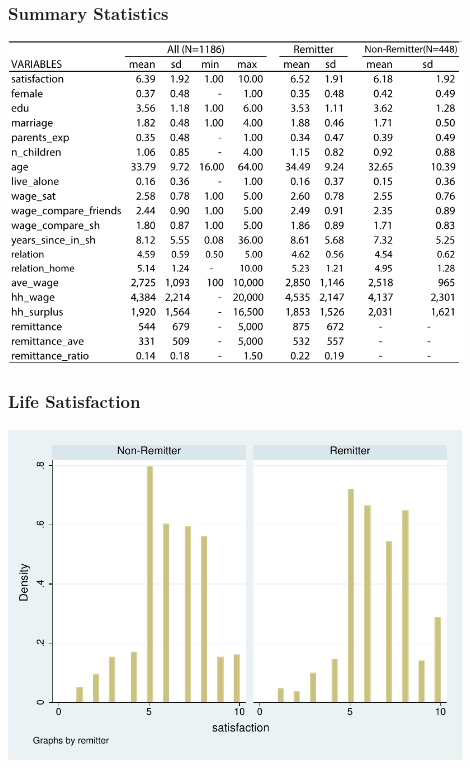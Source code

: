 \documentclass[10pt]{beamer}
\begin{document}
\begin{frame}[c]\frametitle{Summary Statistics}

\begin{center}
\includegraphics[width=0.9\textwidth]{summary.png}
\end{center}
\end{frame}


\begin{frame}[c]\frametitle{Life Satisfaction}
\begin{center}
\includegraphics[width=0.9\textwidth]{satisfaction.pdf}
\end{center}
\end{frame}
\end{document}
